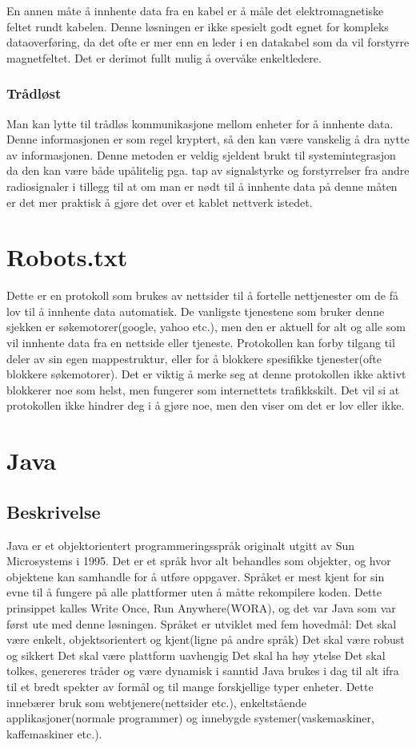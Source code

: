 \documentclass[../main.tex]{subfiles}
\begin{document}
En annen måte å innhente data fra en kabel er å måle det elektromagnetiske feltet rundt kabelen. Denne løsningen er ikke spesielt godt egnet for kompleks dataoverføring, da det ofte er mer enn en leder i en datakabel som da vil forstyrre magnetfeltet. Det er derimot fullt mulig å overvåke enkeltledere.

\subsubsection{Trådløst}
Man kan lytte til trådløs kommunikasjone mellom enheter for å innhente data. Denne informasjonen er som regel kryptert, så den kan være vanskelig å dra nytte av informasjonen. Denne metoden er veldig sjeldent brukt til systemintegrasjon da den kan være både upålitelig pga. tap av signalstyrke og forstyrrelser fra andre radiosignaler i tillegg til at om man er nødt til å innhente data på denne måten er det mer praktisk å gjøre det over et kablet nettverk istedet.

\section{Robots.txt}
Dette er en protokoll som brukes av nettsider til å fortelle nettjenester om de få lov til å innhente data automatisk. De vanligste tjenestene som bruker denne sjekken er søkemotorer(google, yahoo etc.), men den er aktuell for alt og alle som vil innhente data fra en nettside eller tjeneste.
Protokollen kan forby tilgang til deler av sin egen mappestruktur, eller for å blokkere spesifikke tjenester(ofte blokkere søkemotorer). Det er viktig å merke seg at denne protokollen ikke aktivt blokkerer noe som helst, men fungerer som internettets trafikkskilt. Det vil si at protokollen ikke hindrer deg i å gjøre noe, men den viser om det er lov eller ikke.

\section{Java}
\subsection{Beskrivelse}
Java er et objektorientert programmeringsspråk originalt utgitt av Sun Microsystems i 1995. Det er et språk hvor alt behandles som objekter, og hvor objektene kan samhandle for å utføre oppgaver. Språket er mest kjent for sin evne til å fungere på alle plattformer uten å måtte rekompilere koden. Dette prinsippet kalles Write Once, Run Anywhere(WORA), og det var Java som var først ute med denne løsningen.
Språket er utviklet med fem hovedmål:
Det skal være enkelt, objektsorientert og kjent(ligne på andre språk)
Det skal være robust og sikkert
Det skal være plattform uavhengig
Det skal ha høy ytelse
Det skal tolkes, genereres tråder og være dynamisk i sanntid
Java brukes i dag til alt ifra til et bredt spekter av formål og til mange forskjellige typer enheter. Dette innebærer bruk som webtjenere(nettsider etc.), enkeltstående applikasjoner(normale programmer) og innebygde systemer(vaskemaskiner, kaffemaskiner etc.). 
\end{document}
